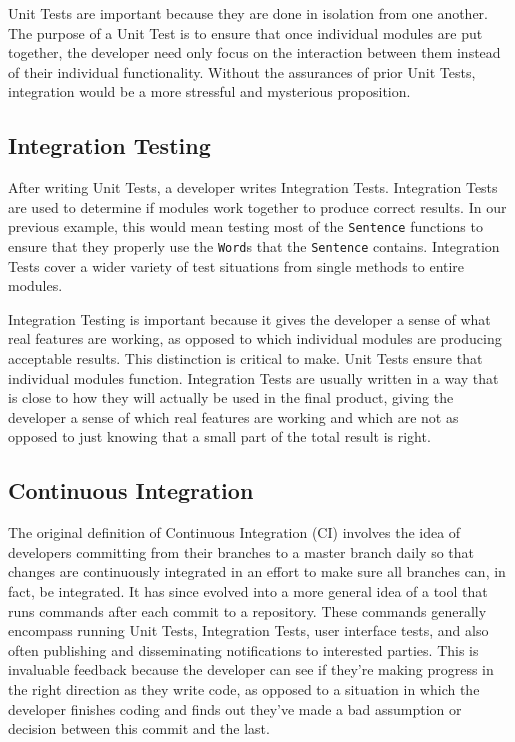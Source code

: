\documentclass[12pt]{ucthesis}
\begin{document}
Unit Tests are important because they are done in isolation from one another. The purpose of a Unit Test is to ensure that once individual modules are put together, the developer need only focus on the interaction between them instead of their individual functionality. Without the assurances of prior Unit Tests, integration would be a more stressful and mysterious proposition.

\subsection{Integration Testing}
After writing Unit Tests, a developer writes Integration Tests. Integration Tests are used to determine if modules work together to produce correct results. In our previous example, this would mean testing most of the \lstinline{Sentence} functions to ensure that they properly use the \lstinline{Word}s that the \lstinline{Sentence} contains. Integration Tests cover a wider variety of test situations from single methods to entire modules.

Integration Testing is important because it gives the developer a sense of what real features are working, as opposed to which individual modules are producing acceptable results. This distinction is critical to make. Unit Tests ensure that individual modules function. Integration Tests are usually written in a way that is close to how they will actually be used in the final product, giving the developer a sense of which real features are working and which are not as opposed to just knowing that a small part of the total result is right.

\subsection{Continuous Integration}
The original definition of Continuous Integration (CI) involves the idea of developers committing from their  branches to a master branch daily so that changes are continuously integrated in an effort to make sure all branches can, in fact, be integrated. It has since evolved into a more general idea of a tool that runs commands after each commit to a repository. These commands generally encompass running Unit Tests, Integration Tests, user interface tests, and also often publishing and disseminating notifications to interested parties. This is invaluable feedback because the developer can see if they're making progress in the right direction as they write code, as opposed to a situation in which the developer finishes coding and finds out they've made a bad assumption or decision between this commit and the last. 
\end{document}
